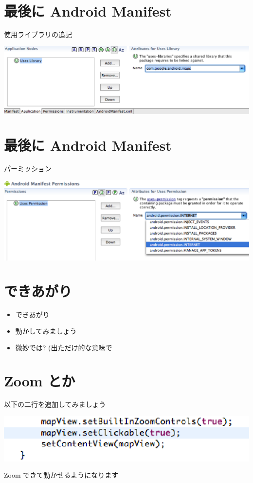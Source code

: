 \documentclass[slide,papersize]{jsarticle}
\begin{document}
\section*{最後に Android Manifest}
使用ライブラリの追記
\begin{center}
\includegraphics[scale=0.28]{uses-library.eps}
\end{center}

\section*{最後に Android Manifest}
パーミッション
\begin{center}
\includegraphics[scale=0.25]{internet-permission.eps}
\end{center}

\section*{できあがり}
\bigskip
\begin{itemize}
\item できあがり
\bigskip
\item 動かしてみましょう
\bigskip
\item 微妙では? (出ただけ的な意味で
\end{itemize}

\section*{Zoom とか}
\medskip
以下の二行を追加してみましょう
\begin{center}
\includegraphics[scale=0.5]{clickableAndZoomable.eps}
\end{center}
Zoom できて動かせるようになります
\end{document}
